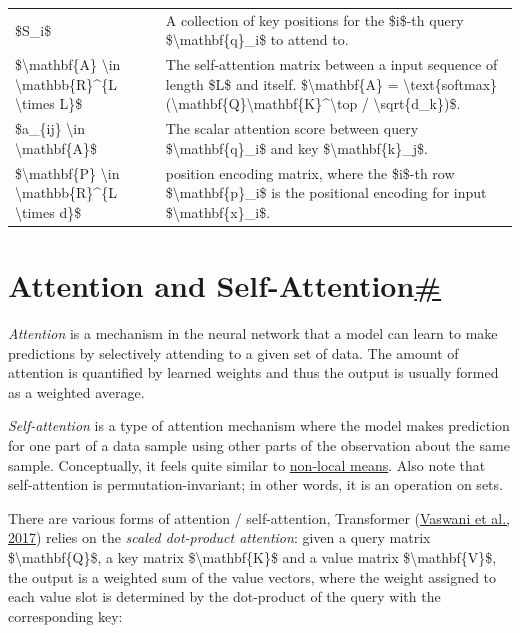 \begin{longtable}[]{@{}ll@{}}
\$S\_i\$ & A collection of key positions for the \$i\$-th query \$\textbackslash mathbf\{q\}\_i\$ to attend to. \\
\$\textbackslash mathbf\{A\} \textbackslash in \textbackslash mathbb\{R\}\^{}\{L \textbackslash times L\}\$ & The self-attention matrix between a input sequence of length \$L\$ and itself. \$\textbackslash mathbf\{A\} = \textbackslash text\{softmax\}(\textbackslash mathbf\{Q\}\textbackslash mathbf\{K\}\^{}\textbackslash top / \textbackslash sqrt\{d\_k\})\$. \\
\$a\_\{ij\} \textbackslash in \textbackslash mathbf\{A\}\$ & The scalar attention score between query \$\textbackslash mathbf\{q\}\_i\$ and key \$\textbackslash mathbf\{k\}\_j\$. \\
\$\textbackslash mathbf\{P\} \textbackslash in \textbackslash mathbb\{R\}\^{}\{L \textbackslash times d\}\$ & position encoding matrix, where the \$i\$-th row \$\textbackslash mathbf\{p\}\_i\$ is the positional encoding for input \$\textbackslash mathbf\{x\}\_i\$. \\
\end{longtable}

\section{\texorpdfstring{Attention and Self-Attention\hyperref[attention-and-self-attention]{\#}}{Attention and Self-Attention\#}}\label{attention-and-self-attention}

\emph{Attention} is a mechanism in the neural network that a model can learn to make predictions by selectively attending to a given set of data. The amount of attention is quantified by learned weights and thus the output is usually formed as a weighted average.

\emph{Self-attention} is a type of attention mechanism where the model makes prediction for one part of a data sample using other parts of the observation about the same sample. Conceptually, it feels quite similar to \href{https://en.wikipedia.org/wiki/Non-local_means}{non-local means}. Also note that self-attention is permutation-invariant; in other words, it is an operation on sets.

There are various forms of attention / self-attention, Transformer (\href{https://arxiv.org/abs/1706.03762}{Vaswani et al., 2017}) relies on the \emph{scaled dot-product attention}: given a query matrix \$\textbackslash mathbf\{Q\}\$, a key matrix \$\textbackslash mathbf\{K\}\$ and a value matrix \$\textbackslash mathbf\{V\}\$, the output is a weighted sum of the value vectors, where the weight assigned to each value slot is determined by the dot-product of the query with the corresponding key:

